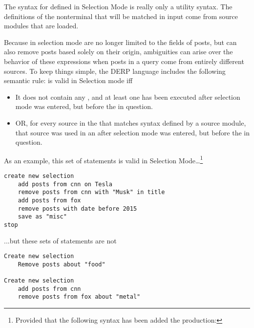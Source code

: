 The syntax for  defined in Selection Mode is really only a utility syntax. The definitions of the nonterminal that will be matched in input come
from source modules that are loaded.

Because  in selection mode are no longer limited to the fields of posts, but can also remove posts based solely on their origin, ambiguities
can arise over the behavior of these expressions when posts in a query come from entirely different sources. To keep things simple, the DERP language includes
the following semantic rule:  is valid in Selection mode iff
\begin{itemize}
\item It does not contain any , and at least one  has been executed after selection mode was entered, but before the  in question.
\item OR, for every source in the  that matches syntax defined by a source module, that source was used in an  after selection mode was entered, but before the  in question.
\end{itemize}
As an example, this set of statements is valid in Selection Mode…\footnote{Provided that the following syntax has been added the production: \hspace{.25in}  \bnf{:}  \bnf{|} }
\newline\begin{minipage}{\linewidth}\begin{lstlisting}
create new selection
    add posts from cnn on Tesla
    remove posts from cnn with "Musk" in title
    add posts from fox
    remove posts with date before 2015
    save as "misc"
stop
\end{lstlisting}\end{minipage}
...but these sets of statements are not
\newline\begin{minipage}{\linewidth}\begin{lstlisting}
Create new selection
    Remove posts about "food"

Create new selection
    add posts from cnn
    remove posts from fox about "metal"
\end{lstlisting}\end{minipage}
